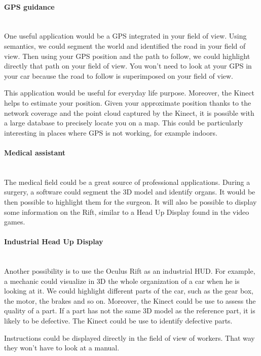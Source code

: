 \documentclass[12pt]{article}
\begin{document}
\paragraph{GPS guidance}~\\
One useful application would be a GPS integrated in your field of view. Using semantics, we could segment the world and identified the road in your field of view. Then using your GPS position and the path to follow, we could highlight directly that path on your field of view. You won't need to look at your GPS in your car because the road to follow is superimposed on your field of view.

This application would be useful for everyday life purpose. Moreover, the Kinect helps to estimate your position. Given your approximate position thanks to the network coverage and the point cloud captured by the Kinect, it is possible with a large database to precisely locate you on a map. This could be particularly interesting in places where GPS is not working, for example indoors.

\paragraph{Medical assistant}~\\
The medical field could be a great source of professional applications. During a surgery, a software could segment the 3D model and identify organs. It would be then possible to highlight them for the surgeon. It will also be possible to display some information on the Rift, similar to a Head Up Display found in the video games.

\paragraph{Industrial Head Up Display}~\\
Another possibility is to use the Oculus Rift as an industrial HUD. For example, a mechanic could visualize in 3D the whole organization of a car when he is looking at it. We could highlight different parts of the car, such as the gear box, the motor, the brakes and so on. Moreover, the Kinect could be use to assess the quality of a part. If a part has not the same 3D model as the reference part, it is likely to be defective. The Kinect could be use to identify defective parts.

Instructions could be displayed directly in the field of view of workers. That way they won't have to look at a manual.
\end{document}
